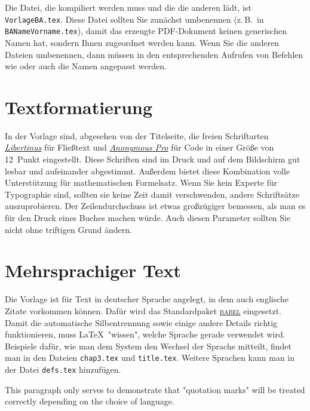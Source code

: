 Die Datei, die kompiliert werden muss und die die anderen lädt, ist
\texttt{VorlageBA.tex}.  Diese Datei sollten Sie zunächst umbenennen (z.\,B.\
in \texttt{BANameVorname.tex}), damit das erzeugte PDF-Dokument keinen
generischen Namen hat, sondern Ihnen zugeordnet werden kann.  Wenn Sie die
anderen Dateien umbenennen, dann müssen in den entsprechenden Aufrufen von
Befehlen wie \verb|| oder \verb|| auch die Namen
angepasst werden.

\section{Textformatierung}

In der Vorlage sind, abgesehen von der Titelseite, die freien Schriftarten
\href{https://tug.org/FontCatalogue/libertinusserif/}{\textit{Libertinus}} für
Fließtext und
\href{https://tug.org/FontCatalogue/anonymouspro/}{\textit{Anonymous Pro}} für
Code in einer Größe von 12~Punkt eingestellt.  Diese Schriften sind im Druck
und auf dem Bildschirm gut lesbar und aufeinander abgestimmt.  Außerdem bietet
diese Kombination volle Unterstützung für mathematischen Formelsatz.  Wenn Sie
kein Experte für Typographie sind, sollten sie keine Zeit damit verschwenden,
andere Schriftsätze auszuprobieren.  Der Zeilendurchschuss ist etwas
großzügiger bemessen, als man es für den Druck eines Buches machen würde.
Auch diesen Parameter sollten Sie nicht ohne triftigen Grund ändern.

\section{Mehrsprachiger Text}

Die Vorlage ist für Text in deutscher Sprache angelegt, in dem auch englische
Zitate vorkommen können.  Dafür wird das Standardpaket
\href{https://www.ctan.org/pkg/babel}{\textsc{babel}} eingesetzt.  Damit die
automatische Silbentrennung sowie einige andere Details richtig funktionieren,
muss \LaTeX\ "wissen", welche Sprache gerade verwendet wird.  Beispiele dafür,
wie man dem System den Wechsel der Sprache mitteilt, findet man in den Dateien
\texttt{chap3.tex} und \texttt{title.tex}.
Weitere Sprachen kann man in der Datei \texttt{defs.tex} hinzufügen.

{
  \begin{otherlanguage}{english}
    This paragraph only serves to demonstrate that "quotation marks" will be
    treated correctly depending on the choice of language.
  \end{otherlanguage}
}

